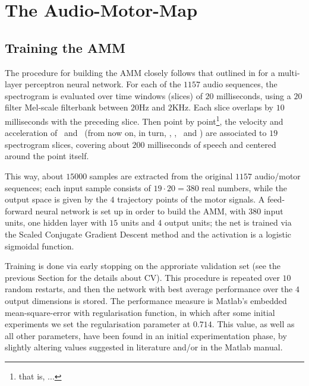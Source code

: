 \section{The Audio-Motor-Map}
\label{sec:rec}

\subsection{Training the AMM}
\label{subsec:amm_setup}

The procedure for building the AMM closely follows that outlined in
\cite{papcun,richmond2002,richmond2007} for a multi-layer perceptron neural network.
For each of the $1157$ audio sequences, the spectrogram is evaluated
over time windows (slices) of $20$ milliseconds, using a $20$ filter
Mel-scale filterbank between $20$Hz and $2$KHz.
Each slice overlaps by $10$ milliseconds with
the preceding slice. Then point by point\footnote{that is, ...}, the velocity and acceleration of
\lio\ and \ttu\ (from now on, in turn, \vlio, \alio, \vttu\ and \attu) are
associated to $19$ spectrogram slices, covering about $200$ milliseconds
of speech and centered around the point itself.


This way, about $15000$ samples are extracted from the original $1157$
audio/motor sequences; each input sample consists of $19\cdot 20 = 380$ real
numbers, while the output space is given by the $4$ trajectory points of
the motor signals. A feed-forward neural network is set up in order to
build the AMM, with $380$ input units, one hidden layer with $15$ units and
$4$ output units; the net is trained via the Scaled Conjugate Gradient
Descent method \cite{MOLLER93} and the activation is a logistic sigmoidal function.

Training is done via early stopping on the approriate validation set (see the previous
Section for the details about CV). This procedure is repeated over $10$ random restarts, and then
the network with best average performance over the $4$ output dimensions is stored.
The performance measure is Matlab's embedded mean-square-error with regularisation
function, in which after some initial experiments we set the regularisation
parameter at $0.714$. This value, as well as all other parameters, have been found in
an initial experimentation phase, by slightly altering values suggested in literature
and/or in the Matlab manual.

